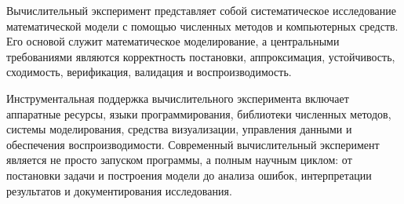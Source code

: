 \documentclass[12pt,a4paper]{article}
\theoremstyle{definition}
\theoremstyle{plain}
\begin{document}
Вычислительный эксперимент представляет собой систематическое исследование математической модели с помощью численных методов и компьютерных средств. Его основой служит математическое моделирование, а центральными требованиями являются корректность постановки, аппроксимация, устойчивость, сходимость, верификация, валидация и воспроизводимость.

Инструментальная поддержка вычислительного эксперимента включает аппаратные ресурсы, языки программирования, библиотеки численных методов, системы моделирования, средства визуализации, управления данными и обеспечения воспроизводимости. Современный вычислительный эксперимент является не просто запуском программы, а полным научным циклом: от постановки задачи и построения модели до анализа ошибок, интерпретации результатов и документирования исследования.
\end{document}
